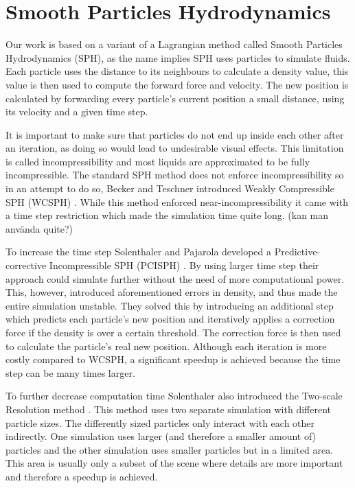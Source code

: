\documentclass[../../main.tex]{subfiles}
\begin{document}
\section{Smooth Particles Hydrodynamics}
Our work is based on a variant of a Lagrangian method called Smooth Particles Hydrodynamics (SPH), as the name implies SPH uses particles to simulate fluids. Each particle uses the distance to its neighbours to calculate a density value, this value is then used to compute the forward force and velocity. The new position is calculated by forwarding every particle's current position a small distance, using its velocity and a given time step. 

It is important to make sure that particles do not end up inside each other after an iteration, as doing so would lead to undesirable visual effects. This limitation is called incompressibility and most liquids are approximated to be fully incompressible. The standard SPH method does not enforce incompressibility so in an attempt to do so, Becker and Teschner introduced Weakly Compressible SPH (WCSPH) \cite{becker2007weakly}. While this method enforced near-incompressibility it came with a time step restriction which made the simulation time quite long. (kan man använda quite?)

To increase the time step Solenthaler and Pajarola developed a Predictive-corrective Incompressible SPH (PCISPH) \cite{solenthaler2009predictive}. By using larger time step their approach could simulate further without the need of more computational power. This, however, introduced aforementioned errors in density, and thus made the entire simulation unstable. They solved this by introducing an additional step which predicts each particle's new position and iteratively applies a correction force if the density is over a certain threshold. The correction force is then used to calculate the particle's real new position. Although each iteration is more costly compared to WCSPH, a significant speedup is achieved because the time step can be many times larger. 

To further decrease computation time Solenthaler also introduced the Two-scale Resolution method \cite{}. This method uses two separate simulation with different particle sizes. The differently sized particles only interact with each other indirectly. One simulation uses larger (and therefore a smaller amount of) particles and the other simulation uses smaller particles but in a limited area. This area is usually only a subset of the scene where details are more important and therefore a speedup is achieved. 
\end{document}
